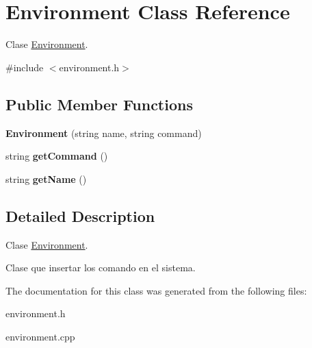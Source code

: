 \hypertarget{class_environment}{}\section{Environment Class Reference}
\label{class_environment}


Clase \hyperlink{class_environment}{Environment}.  




{\ttfamily \#include $<$environment.\+h$>$}

\subsection*{Public Member Functions}
\begin{DoxyCompactItemize}
\item 
{\bfseries Environment} (string name, string command)\hypertarget{class_environment_a804692799a19a2e0612bd073730c36d4}{}\label{class_environment_a804692799a19a2e0612bd073730c36d4}

\item 
string {\bfseries get\+Command} ()\hypertarget{class_environment_a6da44b720b34ec190de86e8912a74985}{}\label{class_environment_a6da44b720b34ec190de86e8912a74985}

\item 
string {\bfseries get\+Name} ()\hypertarget{class_environment_a4e1ced30d94f74ab2835363f97b7d713}{}\label{class_environment_a4e1ced30d94f74ab2835363f97b7d713}

\end{DoxyCompactItemize}


\subsection{Detailed Description}
Clase \hyperlink{class_environment}{Environment}. 

Clase que insertar los comando en el sistema. 

The documentation for this class was generated from the following files\+:\begin{DoxyCompactItemize}
\item 
environment.\+h\item 
environment.\+cpp\end{DoxyCompactItemize}
